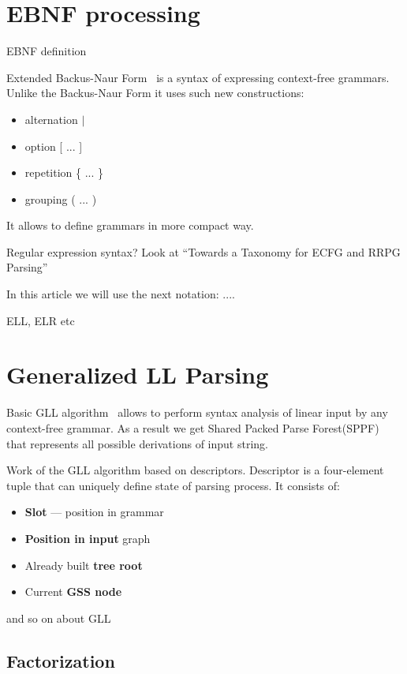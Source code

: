 \documentclass[runningheads,a4paper]{llncs}
\begin{document}
\section{EBNF processing}

EBNF definition

Extended Backus-Naur Form~\cite{iso} is a syntax of expressing context-free grammars. Unlike the Backus-Naur Form it 
uses such new constructions:
\begin{itemize}
    \item alternation $\mid$
    \item option [ ... ]
    \item repetition \{ ... \}
    \item grouping ( ... )
\end{itemize}

It allows to define grammars in more compact way.

Regular expression syntax? Look at ``Towards a Taxonomy for ECFG and RRPG Parsing''

In this article we will use the next notation: ....

ELL, ELR etc


\section{Generalized LL Parsing}%

Basic GLL algorithm~\cite{scott2010gll} allows to perform syntax analysis of linear input by any context-free 
grammar. As a result we get Shared Packed Parse Forest(SPPF)~\cite{SPPF} that represents all possible derivations of input string.

Work of the GLL algorithm based on descriptors. Descriptor is a four-element tuple that can uniquely define state 
of parsing process. It consists of:
\begin{itemize}
    \item \textbf{Slot} --- position in grammar
    \item \textbf{Position in input} graph
    \item Already built \textbf{tree root}
    \item Current \textbf{GSS node}
\end{itemize}

and so on about GLL

\subsection{Factorization}%
\end{document}
